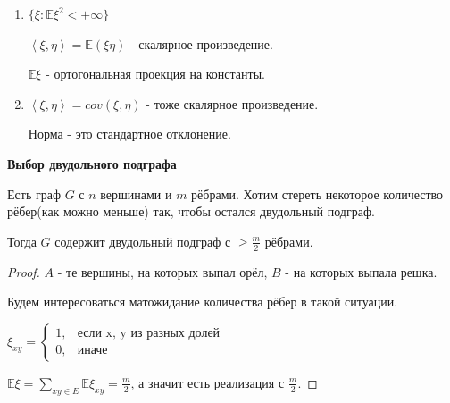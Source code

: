 \begin{remark}
    \begin{enumerate}
        \item {
            $\{ \xi : \mathbb{E} \xi^2 < +\infty \}$

            $\left <\xi, \eta \right > = \mathbb{E} (\xi \eta)$ - скалярное произведение.

            $\mathbb{E} \xi$ - ортогональная проекция на константы.
        }
        \item {
            $\left < \xi, \eta \right > = cov (\xi, \eta)$ - тоже скалярное произведение.

            Норма - это стандартное отклонение.
        }
    \end{enumerate}
\end{remark}

\begin{theorem}
    \textbf{Выбор двудольного подграфа}

    Есть граф $G$ с $n$ вершинами и $m$ рёбрами. Хотим стереть некоторое количество рёбер(как можно меньше) так, чтобы
    остался двудольный подграф.

    Тогда $G$ содержит двудольный подграф с $\geqslant \frac{m}{2}$ рёбрами.
\end{theorem}

\begin{proof}
    $A$ - те вершины, на которых выпал орёл, $B$ - на которых выпала решка.

    Будем интересоваться матожидание количества рёбер в такой ситуации.

    $
    \xi_{xy} = 
    \begin{cases}
        1, & \text{если x, y из разных долей} \\
        0, & \text{иначе}
    \end{cases}
    $

    $\mathbb{E} \xi = \sum_{xy \in E} \mathbb{E} \xi_{xy} = \frac{m}{2}$, а значит есть реализация с $\frac{m}{2}$.
\end{proof}
    